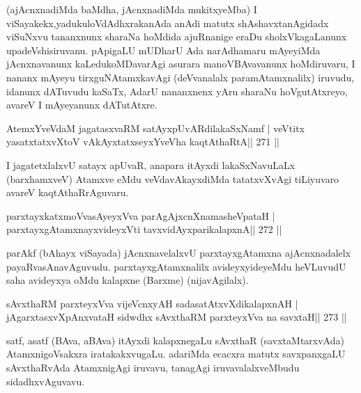 \begin{artha}
(ajAcnxnadiMda baMdha, jAcnxnadiMda mukitxyeMba) I viSayakekx,\break yadukuloVdAdhxrakanAda anAdi matutx shAshavxtanAgidadx viSuNxvu tananxnunx sharaNa hoMdida ajuRnanige eraDu sholxVkagaLanunx upadeVshisiruvanu. pApigaLU mUDharU Ada narAdhamaru mAyeyiMda jAcnxnavanunx kaLedukoMDavarAgi asurara manoVBAvavanunx hoMdiruvaru, I nananx mAyeyu tirxguNAtamxkavAgi (deVvanalalx paramAtamxnalilx) iruvudu, idanunx dATuvudu kaSaTx, AdarU nananxnenx yAru sharaNu hoVgutAtxreyo, avareV I mAyeyanunx dATutAtxre.
\end{artha}


\begin{shl}
AtemxYveVdaM jagatasxvaRM satAyxpUvARdilakaSxNamf |
veVtitx yasatxtatxvXtoV vAkAyxtatxseyxYveVha kaqtAthaRtA\hfill || 271 ||
\end{shl}

\begin{artha}
I jagatetxlalxvU satayx apUvaR, anapara itAyxdi lakaSxNavuLaLx  (barxhamxveV) Atamxve eMdu veVdavAkayxdiMda tatatxvXvAgi tiLiyuvaro avareV kaqtAthaRrAguvaru.
\end{artha}

\begin{shl}
parxtayxkatxmoVvasAyeyxVva parAgAjxcnXnamasheVpataH |
parxtayxgAtamxnayxvideyxVti tavxvidAyxparikalapxnA\hfill || 272 ||
\end{shl}

\begin{artha}
parAkf (bAhayx viSayada) jAcnxnavelalxvU parxtayxgAtamxna  ajAcnxnadalelx payaRvasAnavAguvudu. parxtayxgAtamxnalilx avideyxyideyeMdu heVLuvudU saha avideyxya oMdu kalapxne (Barxme) (nijavAgilalx).
\end{artha}

\begin{shl}
sAvxthaRM parxteyxVva vijeVcnxyAH sadasatAtxvXdikalapxnAH |
jAgarxtasxvXpAnxvataH sidwdhx sAvxthaRM parxteyxVva na savxtaH\hfill || 273 ||
\end{shl}

\begin{artha}
satf, asatf (BAva, aBAva) itAyxdi kalapxnegaLu sAvxthaR  (savxtaMtarxvAda) AtamxnigoVsakxra iratakakxvugaLu. adariMda ecacxra  matutx savxpanxgaLU sAvxthaRvAda AtamxnigAgi iruvavu, tanagAgi iruvavalalxveMbudu sidadhxvAguvavu.
\end{artha}



